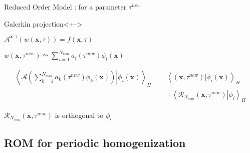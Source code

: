 \begin{frame}{Reduced Order Model : for a parameter $\tau^{new}$}
\begin{block}{Galerkin projection}<+->
%
\begin{description}
\item<+-> [For a given problem] $\mathcal{A}^{\mathbf{x},\tau}\left(w(\mathbf{x},\tau)\right)=f(\mathbf{x},\tau)$
\item<+-> [ROM] $w(\mathbf{x},\tau^{new})\simeq\sum\limits_{i=1}^{N_{rom}} a_i(\tau^{new})\phi_i(\mathbf{x})$
\item<+-> [The problem in $a_k(\tau^{new})$ : projection on $\phi_i$] %
\[%
\begin{split}
\left\langle\left.\mathcal{A}\left(\sum\limits_{k=1}^{N_{rom}} a_k(\tau^{new})\phi_k(\mathbf{x})\right) \right|\phi_i\left(\mathbf{x}\right)\right\rangle_H =& %
\left\langle\left(\mathbf{x},\tau^{new}\right)|\phi_i(\mathbf{x})\right\rangle_H\\%
%
&+\left\langle\left.\mathcal{R}_{N_{rom}}(\mathbf{x},\tau^{new})\right|\phi_i\right\rangle_H
\end{split}
\]
\item<+-> [Remainder term] $\mathcal{R}_{N_{rom}}(\mathbf{x},\tau^{new})$ is orthogonal to $\phi_i$
\end{description}
%
\end{block}
%
\end{frame}

\subsection{ROM for periodic homogenization}

